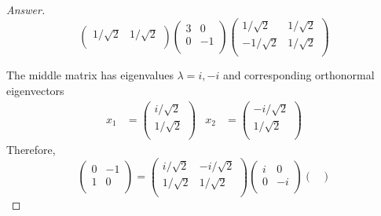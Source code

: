 \documentclass[../psets.tex]{subfiles}
\begin{document}
\begin{enumerate}[label={\textbf{6.\arabic*.}}]
\begin{proof}[Answer]
\begin{equation*}
\begin{pmatrix}
                1/\sqrt{2} & 1/\sqrt{2}\\
            \end{pmatrix}
            \begin{pmatrix}
                3 & 0\\
                0 & -1\\
            \end{pmatrix}
            \begin{pmatrix}
                1/\sqrt{2} & 1/\sqrt{2}\\
                -1/\sqrt{2} & 1/\sqrt{2}\\
            \end{pmatrix}
        \end{equation*}\par
        The middle matrix has eigenvalues $\lambda=i,-i$ and corresponding orthonormal eigenvectors
        \begin{align*}
            x_1 &=
            \begin{pmatrix}
                i/\sqrt{2}\\
                1/\sqrt{2}\\
            \end{pmatrix}&
            x_2 &=
            \begin{pmatrix}
                -i/\sqrt{2}\\
                1/\sqrt{2}\\
            \end{pmatrix}
        \end{align*}
        Therefore,
        \begin{equation*}
            \begin{pmatrix}
                0 & -1\\
                1 & 0\\
            \end{pmatrix}
            =
            \begin{pmatrix}
                i/\sqrt{2} & -i/\sqrt{2}\\
                1/\sqrt{2} & 1/\sqrt{2}\\
            \end{pmatrix}
            \begin{pmatrix}
                i & 0\\
                0 & -i\\
            \end{pmatrix}
            \begin{pmatrix}

\end{pmatrix}
\end{equation*}
\end{proof}
\end{enumerate}
\end{document}
